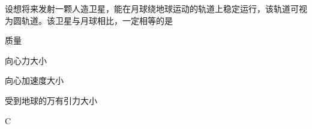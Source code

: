 设想将来发射一颗人造卫星，能在月球绕地球运动的轨道上稳定运行，该轨道可视为圆轨道。该卫星与月球相比，一定相等的是\paren[]
\begin{choices}
	\item 质量
	\item 向心力大小
	\item 向心加速度大小
	\item 受到地球的万有引力大小
\end{choices}
\begin{answer}
    C
\end{answer}